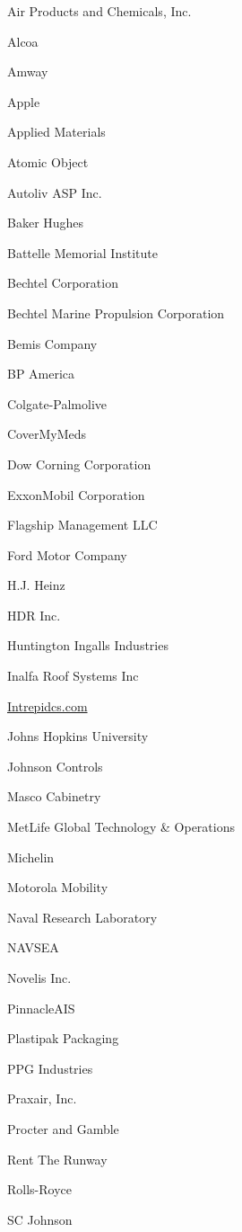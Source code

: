 \documentclass[twoside]{article}
\begin{document}
\begin{center}
\begin{multicols}{5}
\begin{FlushLeft}
\begin{compactitem}
\item Air Products and Chemicals, Inc.
\item Alcoa
\item Amway
\item Apple
\item Applied Materials
\item Atomic Object
\item Autoliv ASP Inc.
\item Baker Hughes
\item Battelle Memorial Institute
\item Bechtel Corporation
\item Bechtel Marine Propulsion Corporation
\item Bemis Company
\item BP America
\item Colgate-Palmolive
\item CoverMyMeds
\item Dow Corning Corporation
\item ExxonMobil Corporation
\item Flagship Management LLC
\item Ford Motor Company
\item H.J. Heinz
\item HDR Inc.
\item Huntington Ingalls Industries
\item Inalfa Roof Systems Inc
\item \url{Intrepidcs.com}
\item Johns Hopkins University
\item Johnson Controls
\item Masco Cabinetry
\item MetLife Global Technology \& Operations
\item Michelin
\item Motorola Mobility
\item Naval Research Laboratory
\item NAVSEA
\item Novelis Inc.
\item PinnacleAIS
\item Plastipak Packaging
\item PPG Industries
\item Praxair, Inc.
\item Procter and Gamble
\item Rent The Runway
\item Rolls-Royce
\item SC Johnson

\end{compactitem}
\end{FlushLeft}
\end{multicols}
\end{center}
\end{document}
